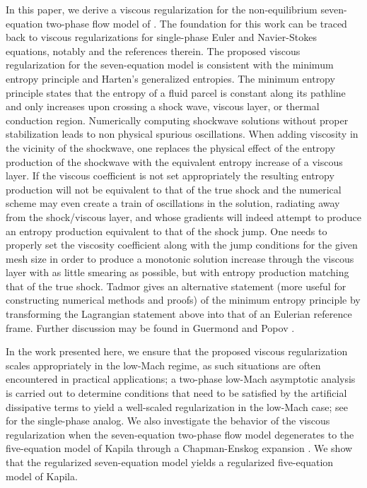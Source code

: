 \documentclass[preprint,10pt]{elsarticle}
\begin{document}
In this paper, we derive a viscous regularization for the non-equilibrium seven-equation two-phase flow model of \cite{SEM}. The foundation for this work 
can be traced back to viscous regularizations for single-phase Euler and Navier-Stokes equations, notably \cite{jlg} and the references therein. 
The proposed viscous regularization for the seven-equation model is consistent with the minimum entropy principle and Harten's generalized 
entropies. 
The minimum entropy principle states that the entropy of a fluid parcel is constant along its pathline
and only increases upon crossing a shock wave, viscous layer, or thermal conduction region.  Numerically computing 
shockwave solutions without proper stabilization leads to non physical spurious oscillations. When adding viscosity in the vicinity 
of the shockwave, one replaces the physical effect of the entropy production of the shockwave with the equivalent entropy increase of a viscous layer.  
If the viscous coefficient is not set appropriately 
the resulting entropy production will not be equivalent to that of the true shock and the numerical scheme %
may even create a train of 
oscillations in the solution, radiating away from the shock/viscous layer, and whose gradients will indeed attempt to produce an entropy production equivalent 
to that of the shock jump. One needs to properly set the viscosity coefficient along with the jump conditions for the given mesh size in order 
to produce a monotonic solution increase through the viscous layer with as little smearing as possible, but with entropy production matching that of the true shock.
Tadmor \cite{tadmor_minimum_entropy_principle} gives an alternative statement (more useful for constructing numerical methods and proofs) of the minimum 
entropy principle by transforming the Lagrangian statement above into that of an Eulerian reference frame. Further discussion may be found in Guermond and Popov \cite{jlg}.

In the work presented here, we ensure that the proposed viscous regularization scales appropriately in the low-Mach regime, as such situations are often encountered 
in practical applications; a two-phase low-Mach asymptotic analysis is carried out to determine conditions that need to be satisfied by the artificial dissipative 
terms to yield a well-scaled regularization in the low-Mach case; see \cite{Marco_paper_low_mach} for the single-phase analog. 
We also investigate the behavior of the viscous regularization when the seven-equation two-phase flow model degenerates to the five-equation 
model of Kapila \cite{Kapila_2001} through a Chapman-Enskog expansion \cite{dellacherie, GuillardMurrone2003}. We show 
that the regularized seven-equation model yields a regularized five-equation model of Kapila.
\end{document}
